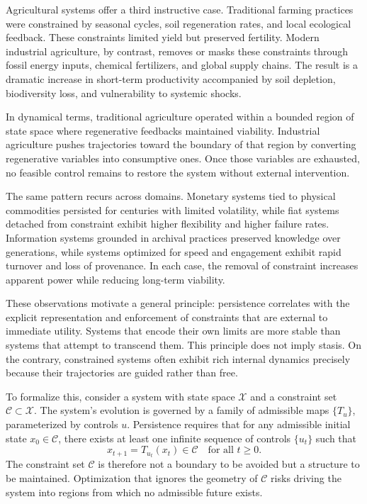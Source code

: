 \documentclass[12pt,oneside]{book}
\begin{document}
Agricultural systems offer a third instructive case. Traditional farming practices were constrained by seasonal cycles, soil regeneration rates, and local ecological feedback. These constraints limited yield but preserved fertility. Modern industrial agriculture, by contrast, removes or masks these constraints through fossil energy inputs, chemical fertilizers, and global supply chains. The result is a dramatic increase in short-term productivity accompanied by soil depletion, biodiversity loss, and vulnerability to systemic shocks.

In dynamical terms, traditional agriculture operated within a bounded region of state space where regenerative feedbacks maintained viability. Industrial agriculture pushes trajectories toward the boundary of that region by converting regenerative variables into consumptive ones. Once those variables are exhausted, no feasible control remains to restore the system without external intervention.

The same pattern recurs across domains. Monetary systems tied to physical commodities persisted for centuries with limited volatility, while fiat systems detached from constraint exhibit higher flexibility and higher failure rates. Information systems grounded in archival practices preserved knowledge over generations, while systems optimized for speed and engagement exhibit rapid turnover and loss of provenance. In each case, the removal of constraint increases apparent power while reducing long-term viability.

These observations motivate a general principle: persistence correlates with the explicit representation and enforcement of constraints that are external to immediate utility. Systems that encode their own limits are more stable than systems that attempt to transcend them. This principle does not imply stasis. On the contrary, constrained systems often exhibit rich internal dynamics precisely because their trajectories are guided rather than free.

To formalize this, consider a system with state space \(\mathcal{X}\) and a constraint set \(\mathcal{C} \subset \mathcal{X}\). The system's evolution is governed by a family of admissible maps \(\{T_u\}\), parameterized by controls \(u\). Persistence requires that for any admissible initial state \(x_0 \in \mathcal{C}\), there exists at least one infinite sequence of controls \(\{u_t\}\) such that
\[
x_{t+1} = T_{u_t}(x_t) \in \mathcal{C} \quad \text{for all } t \geq 0.
\]
The constraint set \(\mathcal{C}\) is therefore not a boundary to be avoided but a structure to be maintained. Optimization that ignores the geometry of \(\mathcal{C}\) risks driving the system into regions from which no admissible future exists.
\end{document}
